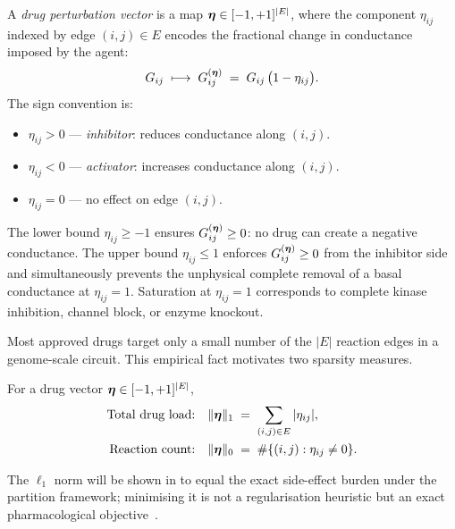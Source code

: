 \begin{definition}
\label{def:drug-vector-ch9}
A \emph{drug perturbation vector} is a map
$\boldsymbol{\eta} \in [-1,+1]^{|E|}$,
where the component $\eta_{ij}$ indexed by edge $(i,j) \in E$ encodes the
fractional change in conductance imposed by the agent:
\begin{equation}
  G_{ij} \;\longmapsto\; G_{ij}^{(\boldsymbol{\eta})} \;=\; G_{ij}\,\bigl(1 - \eta_{ij}\bigr).
  \label{eq:conductance-perturbation}
\end{equation}
The sign convention is:
\begin{itemize}[leftmargin=2em]
  \item $\eta_{ij} > 0$ — \emph{inhibitor}: reduces conductance along $(i,j)$.
  \item $\eta_{ij} < 0$ — \emph{activator}: increases conductance along $(i,j)$.
  \item $\eta_{ij} = 0$ — no effect on edge $(i,j)$.
\end{itemize}
\end{definition}

\begin{remark}
The lower bound $\eta_{ij} \geq -1$ ensures $G_{ij}^{(\boldsymbol{\eta})} \geq 0$: no
drug can create a negative conductance.  The upper bound $\eta_{ij} \leq 1$
enforces $G_{ij}^{(\boldsymbol{\eta})} \geq 0$ from the inhibitor side and simultaneously
prevents the unphysical complete removal of a basal conductance at $\eta_{ij} = 1$.
Saturation at $\eta_{ij} = 1$ corresponds to complete kinase inhibition,
channel block, or enzyme knockout.
\end{remark}

Most approved drugs target only a small number of the $|E|$ reaction edges in
a genome-scale circuit.  This empirical fact motivates two sparsity measures.

\begin{definition}
\label{def:drug-load}
For a drug vector $\boldsymbol{\eta} \in [-1,+1]^{|E|}$,
\begin{align}
  \text{Total drug load:}   &\quad \|\boldsymbol{\eta}\|_1 \;=\; \sum_{(i,j)\in E} |\eta_{ij}|, \label{eq:drug-load}\\
  \text{Reaction count:}    &\quad \|\boldsymbol{\eta}\|_0 \;=\; \#\{(i,j) : \eta_{ij} \neq 0\}.
\end{align}
\end{definition}

The $\ell_1$ norm will be shown in  to equal
the exact side-effect burden under the partition framework; minimising it is
not a regularisation heuristic but an exact pharmacological objective~\citep{Tibshirani1996}.

